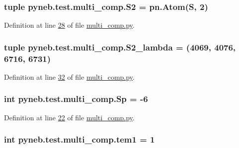 \subsubsection[{S2}]{\setlength{\rightskip}{0pt plus 5cm}tuple pyneb.\+test.\+multi\+\_\+comp.\+S2 = pn.\+Atom(\textquotesingle{}S\textquotesingle{}, 2)}\label{namespacepyneb_1_1test_1_1multi__comp_a8d90734f103bcd80bced4c908bfeb493}


Definition at line \hyperlink{multi__comp_8py_source_l00028}{28} of file \hyperlink{multi__comp_8py_source}{multi\+\_\+comp.\+py}.

\hypertarget{namespacepyneb_1_1test_1_1multi__comp_aac760bd0cfecb07df5afa64ec3f82947}{}
\subsubsection[{S2\+\_\+lambda}]{\setlength{\rightskip}{0pt plus 5cm}tuple pyneb.\+test.\+multi\+\_\+comp.\+S2\+\_\+lambda = (4069, 4076, 6716, 6731)}\label{namespacepyneb_1_1test_1_1multi__comp_aac760bd0cfecb07df5afa64ec3f82947}


Definition at line \hyperlink{multi__comp_8py_source_l00032}{32} of file \hyperlink{multi__comp_8py_source}{multi\+\_\+comp.\+py}.

\hypertarget{namespacepyneb_1_1test_1_1multi__comp_a7dc22733a7dc31447af80b017a4366c0}{}
\subsubsection[{Sp}]{\setlength{\rightskip}{0pt plus 5cm}int pyneb.\+test.\+multi\+\_\+comp.\+Sp = -\/6}\label{namespacepyneb_1_1test_1_1multi__comp_a7dc22733a7dc31447af80b017a4366c0}


Definition at line \hyperlink{multi__comp_8py_source_l00022}{22} of file \hyperlink{multi__comp_8py_source}{multi\+\_\+comp.\+py}.

\hypertarget{namespacepyneb_1_1test_1_1multi__comp_ab8fc3832c90b6cbaed3c320eff36daf2}{}
\subsubsection[{tem1}]{\setlength{\rightskip}{0pt plus 5cm}int pyneb.\+test.\+multi\+\_\+comp.\+tem1 = 1}\label{namespacepyneb_1_1test_1_1multi__comp_ab8fc3832c90b6cbaed3c320eff36daf2}


